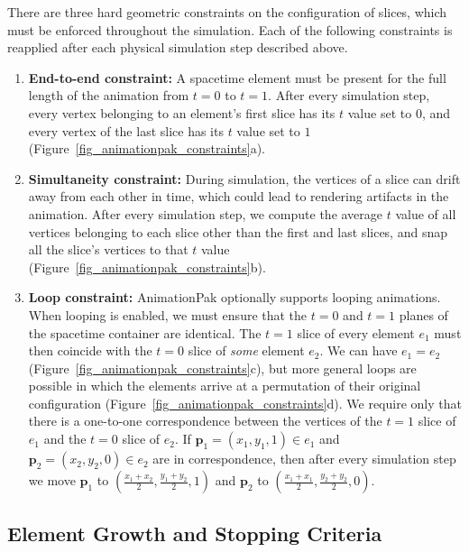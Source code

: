 There are three hard geometric constraints on the configuration of slices,
which must be enforced throughout the simulation.  Each of the following
constraints is reapplied after each physical simulation step described above.

\begin{enumerate}
\item \textbf{End-to-end constraint:}
A spacetime element must be present for the full length of the animation
from $t=0$ to $t=1$.  After every simulation step, every vertex belonging
to an element's first slice has its $t$ value set to $0$, and every vertex
of the last slice has its $t$ value set to $1$
(Figure~\ref{fig_animationpak_constraints}a).

\item \textbf{Simultaneity constraint:}
During simulation, the vertices of a slice can drift away from each
other in time, which could lead to rendering artifacts in the animation.
After every simulation step, we compute the average $t$ value of all
vertices belonging to each slice other than the first and last slices, and 
snap all the slice's vertices to that $t$ value 
(Figure~\ref{fig_animationpak_constraints}b).

\item \textbf{Loop constraint:}
AnimationPak optionally supports looping animations.
When looping is enabled, we must ensure that the $t=0$ and $t=1$ planes
of the spacetime container are identical.  
The $t=1$ slice of every element $e_1$ must then 
coincide with the $t=0$ slice of \textit{some} 
element $e_2$.  We can have $e_1=e_2$ 
(Figure~\ref{fig_animationpak_constraints}c), but more general loops are possible in which
the elements arrive at a permutation of their original configuration
(Figure~\ref{fig_animationpak_constraints}d).  We require only that there is a one-to-one
correspondence between the vertices of the $t=1$ slice of $e_1$ and the
$t=0$ slice of $e_2$.  If $\bm{p}_1=(x_1,y_1,1)\in e_1$ and
$\bm{p}_2=(x_2,y_2,0)\in e_2$
are in correspondence, then after every simulation step we
move $\bm{p}_1$ to $(\frac{x_1+x_2}{2},\frac{y_1+y_2}{2},1)$ and
$\bm{p}_2$ to $(\frac{x_1+x_1}{2},\frac{y_2+y_2}{2},0)$.
\end{enumerate}


\subsection{Element Growth and Stopping Criteria}
\label{animationpak_element_growth_and_stopping_criteria}

